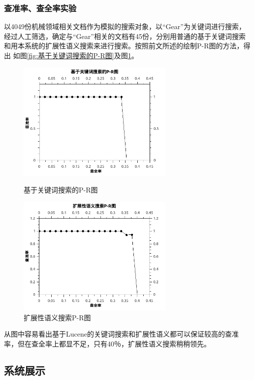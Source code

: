 \documentclass[12pt,a4paper]{article}
\begin{document}
		\subsubsection{查准率、查全率实验}
	以4049份机械领域相关文档作为模拟的搜索对象，以“Gear”为关键词进行搜索，经过人工筛选，确定与“Gear”相关的文档有45份，分别用普通的基于关键词搜索和用本系统的扩展性语义搜索来进行搜索。按照前文所述的绘制P-R图的方法，得出	如图\ref{fig:基于关键词搜索的P-R图}及图\ref{fig:扩展性语义搜索P-R图}。
	\begin{figure}[htbp]
	\begin{minipage}[t]{0.5\linewidth}
	\centering
	\includegraphics[width=3in]{fig/KeywordBasedPR.jpg}
	\caption{基于关键词搜索的P-R图}
	\label{fig:基于关键词搜索的P-R图}
	\end{minipage}
	\begin{minipage}[t]{0.5\linewidth}
	\centering
	\includegraphics[width=3in]{fig/OntologyBasedPR.jpg}
	\caption{扩展性语义搜索P-R图}
	\label{fig:扩展性语义搜索P-R图}
	\end{minipage}
	\end{figure}
	从图中容易看出基于Lucene的关键词搜索和扩展性语义都可以保证较高的查准率，但在查全率上都显不足，只有40％，扩展性语义搜索稍稍领先。
	\subsection{系统展示}	
	
\end{document}
